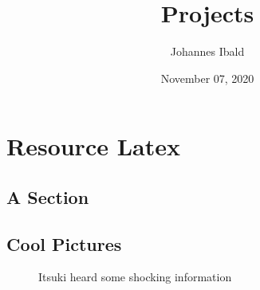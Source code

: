 \documentclass[a4paper,12pt]{book}
\begin{document}
\title{\Large{\textbf{Projects}}}
\author{Johannes Ibald}
\date{November 07, 2020}

\frontmatter
{} %
\setcounter{page}{2} %

\maketitle
\let\cleardoublepage\clearpage
\tableofcontents %



\mainmatter
{}
\chapter{Resource Latex}

\blindmathtrue
\blindtext[5]

\section{A Section}
\enlargethispage{\baselineskip} %
\blindtext[2]
\blinditemize
\blindenumerate
\blinddescription


\section{Cool Pictures}

\begin{figure}[ht]  %
\centering
\caption{Itsuki heard some shocking information}\label{fig:Ituski_shocked}
\end{figure}
\blindtext[2]
\newpage
\end{document}
